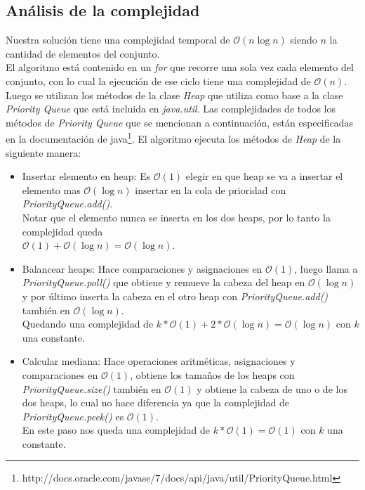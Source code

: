 \subsection{Análisis de la complejidad}
Nuestra solución tiene una complejidad temporal de $\mathcal{O}(n\log{}n)$ siendo $n$ la cantidad de elementos del conjunto. \\

El algoritmo está contenido en un \emph{for} que recorre una sola vez cada elemento del conjunto, con lo cual la ejecución de ese ciclo tiene una complejidad de $\mathcal{O}(n)$. Luego se utilizan los métodos de la clase \emph{Heap} que utiliza como base a la clase \emph{Priority Queue} que está incluida en \emph{java.util}. Las complejidades de todos los métodos de \emph{Priority Queue} que se mencionan a continuación, están especificadas en la documentación de java\footnote{http://docs.oracle.com/javase/7/docs/api/java/util/PriorityQueue.html}. El algoritmo ejecuta los métodos de \emph{Heap} de la siguiente manera:

\begin{itemize}
	\item Insertar elemento en heap: Es $\mathcal{O}(1)$ elegir en que heap se va a insertar el elemento mas $\mathcal{O}(\log{}n)$ insertar en la cola de prioridad con \emph{PriorityQueue.add()}.\\ Notar que el elemento nunca se inserta en los dos heaps, por lo tanto la complejidad queda\\ $\mathcal{O}(1) + \mathcal{O}(\log{}n) = \mathcal{O}(\log{}n)$.
	\item Balancear heaps: Hace comparaciones y asignaciones en $\mathcal{O}(1)$, luego llama a \emph{PriorityQueue.poll()} que obtiene y remueve la cabeza del heap en $\mathcal{O}(\log{}n)$ y por último inserta la cabeza en el otro heap con \emph{PriorityQueue.add()} también en $\mathcal{O}(\log{}n)$.\\ Quedando una complejidad de $k * \mathcal{O}(1) + 2 * \mathcal{O}(\log{}n) = \mathcal{O}(\log{}n)$ con $k$ una constante.
	\item Calcular mediana: Hace operaciones aritméticas, asignaciones y comparaciones en $\mathcal{O}(1)$, obtiene los tamaños de los heaps con \emph{PriorityQueue.size()} también en $\mathcal{O}(1)$ y obtiene la cabeza de uno o de los dos heaps, lo cual no hace diferencia ya que la complejidad de \emph{PriorityQueue.peek()} es $\mathcal{O}(1)$.\\ En este paso nos queda una complejidad de $k * \mathcal{O}(1) = \mathcal{O}(1)$ con $k$ una constante.
\end{itemize}


